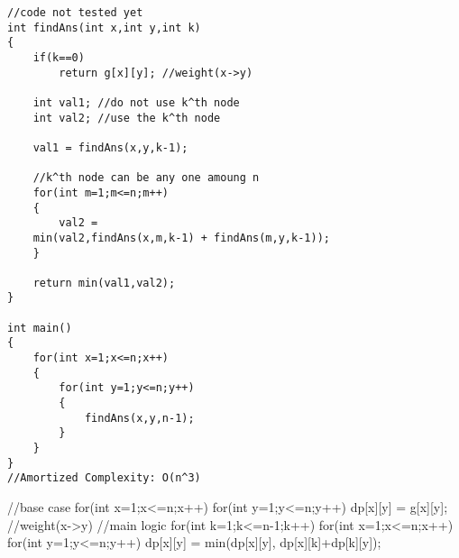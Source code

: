 \begin{fullwidth}
    
\begin{minipage}{0.5\fullfigurelen}
\begin{lstlisting}[style=scode,caption=Recursive Code]
//code not tested yet
int findAns(int x,int y,int k)
{
    if(k==0)
        return g[x][y]; //weight(x->y)

    int val1; //do not use k^th node
    int val2; //use the k^th node

    val1 = findAns(x,y,k-1);

    //k^th node can be any one amoung n
    for(int m=1;m<=n;m++) 
    {
        val2 = 
    min(val2,findAns(x,m,k-1) + findAns(m,y,k-1));
    }

    return min(val1,val2);
}

int main()
{
    for(int x=1;x<=n;x++)
    {
        for(int y=1;y<=n;y++)
        {
            findAns(x,y,n-1);
        }
    }
}
//Amortized Complexity: O(n^3)
\end{lstlisting}
\end{minipage}
\begin{minipage}{0.5\fullfigurelen}
\begin{code3}

    //base case
    for(int x=1;x<=n;x++)
    {
        for(int y=1;y<=n;y++)
        {
            dp[x][y] = g[x][y]; //weight(x->y)
        }
    }
    //main logic
    for(int k=1;k<=n-1;k++)
    {
        for(int x=1;x<=n;x++)
        {
            for(int y=1;y<=n;y++)
            {
                dp[x][y] = min(dp[x][y],
                            dp[x][k]+dp[k][y]);
            }
        }
    }
\end{code3}
\end{minipage}
\end{fullwidth}
